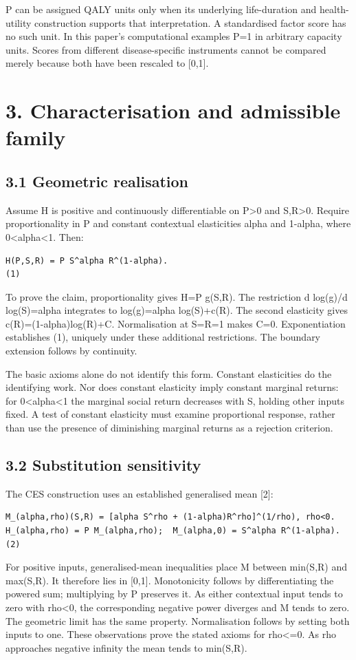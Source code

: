 \documentclass[11pt,a4paper]{article}
\begin{document}
P can be assigned QALY units only when its underlying life-duration and health-utility construction supports that interpretation. A standardised factor score has no such unit. In this paper's computational examples P=1 in arbitrary capacity units. Scores from different disease-specific instruments cannot be compared merely because both have been rescaled to [0,1].

\section*{3. Characterisation and admissible family}
\subsection*{3.1 Geometric realisation}
Assume H is positive and continuously differentiable on P\textgreater{}0 and S,R\textgreater{}0. Require proportionality in P and constant contextual elasticities alpha and 1-alpha, where 0\textless{}alpha\textless{}1. Then:

{\footnotesize\begin{verbatim}
H(P,S,R) = P S^alpha R^(1-alpha).                                      (1)
\end{verbatim}}
To prove the claim, proportionality gives H=P g(S,R). The restriction d log(g)/d log(S)=alpha integrates to log(g)=alpha log(S)+c(R). The second elasticity gives c(R)=(1-alpha)log(R)+C. Normalisation at S=R=1 makes C=0. Exponentiation establishes (1), uniquely under these additional restrictions. The boundary extension follows by continuity.

The basic axioms alone do not identify this form. Constant elasticities do the identifying work. Nor does constant elasticity imply constant marginal returns: for 0\textless{}alpha\textless{}1 the marginal social return decreases with S, holding other inputs fixed. A test of constant elasticity must examine proportional response, rather than use the presence of diminishing marginal returns as a rejection criterion.

\subsection*{3.2 Substitution sensitivity}
The CES construction uses an established generalised mean [2]:

{\footnotesize\begin{verbatim}
M_(alpha,rho)(S,R) = [alpha S^rho + (1-alpha)R^rho]^(1/rho), rho<0.
H_(alpha,rho) = P M_(alpha,rho);  M_(alpha,0) = S^alpha R^(1-alpha).     (2)
\end{verbatim}}
For positive inputs, generalised-mean inequalities place M between min(S,R) and max(S,R). It therefore lies in [0,1]. Monotonicity follows by differentiating the powered sum; multiplying by P preserves it. As either contextual input tends to zero with rho\textless{}0, the corresponding negative power diverges and M tends to zero. The geometric limit has the same property. Normalisation follows by setting both inputs to one. These observations prove the stated axioms for rho\textless{}=0. As rho approaches negative infinity the mean tends to min(S,R).
\end{document}

